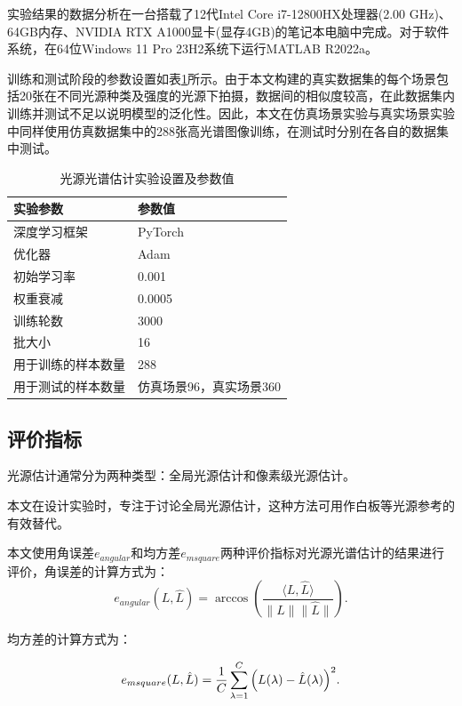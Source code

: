 \documentclass[
    type = master, %
    degree = academic,        %
    decl-page,  %
  ]{njuthesis}
\begin{document}
实验结果的数据分析在一台搭载了12代Intel Core i7-12800HX处理器(2.00 GHz)、64GB内存、NVIDIA RTX A1000显卡(显存4GB)的笔记本电脑中完成。对于软件系统，在64位Windows 11 Pro 23H2系统下运行MATLAB R2022a。

训练和测试阶段的参数设置如表\ref{tab:illum param}所示。由于本文构建的真实数据集的每个场景包括20张在不同光源种类及强度的光源下拍摄，数据间的相似度较高，在此数据集内训练并测试不足以说明模型的泛化性。因此，本文在仿真场景实验与真实场景实验中同样使用仿真数据集中的288张高光谱图像训练，在测试时分别在各自的数据集中测试。

\begin{table}[h]
\caption{光源光谱估计实验设置及参数值 }
\label{tab:illum param}
\begin{tabular}{ll}
\hline
实验参数   & 参数值     \\ \hline
深度学习框架 & PyTorch \\
优化器    & Adam   \\
初始学习率  & 0.001  \\
权重衰减   & 0.0005  \\
训练轮数   & 3000     \\
批大小    & 16       \\ 
用于训练的样本数量  &  288 \\
用于测试的样本数量  &  仿真场景96，真实场景360 \\
\hline
\end{tabular}
\end{table}

\subsection{评价指标}
光源估计通常分为两种类型：全局光源估计和像素级光源估计。 

本文在设计实验时，专注于讨论全局光源估计，这种方法可用作白板等光源参考的有效替代。

本文使用角误差$e_{angular}$和均方差$e_{msquare}$两种评价指标对光源光谱估计的结果进行评价，角误差的计算方式为：
\begin{equation}\label{angular error}
{e_{angular}}(L, \hat{L}) = \arccos\left(\frac{\langle{L}, \hat{L}\rangle}{\|{L}\|\|\hat{L}\|}\right).
\end{equation}

均方差的计算方式为：

\begin{equation}\label{$e_{msquare}$}
{e_{msquare}}(L, \hat{L}) = \frac{1}{C}\sum\limits_{\lambda  = 1}^C {{{\left({L(\lambda)-\hat L(\lambda)} \right)}^2}}.
\end{equation}
\end{document}
